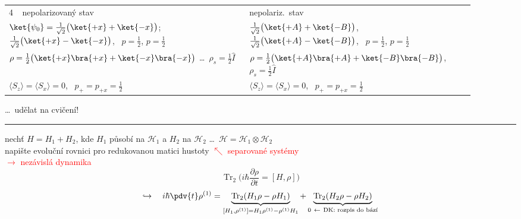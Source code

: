 \begin{tabular}{@{}p{0.47\linewidth}@{\quad$\longrightarrow$\quad}p{0.44\linewidth}@{}}
\textcircled{4} \ nepolarizovaný stav & nepolariz.\ stav \\
$\ket{\psi_0} = \tfrac{1}{\sqrt2}\big(\ket{+x} + \ket{-x}\big)$; \ $\tfrac{1}{\sqrt2}\big(\ket{+x} - \ket{-x}\big)$, \ $p = \frac12$, $p = \frac12$ &
$\tfrac{1}{\sqrt2}\big(\ket{+A} + \ket{-B}\big)$, \ $\tfrac{1}{\sqrt2}\big(\ket{+A} - \ket{-B}\big)$, \ $p = \frac12$, $p = \frac12$ \\
$\rho = \frac12\big(\ket{+x}\bra{+x} + \ket{-x}\bra{-x}\big)$ \dots\ $\rho_s = \frac12\hat I$ &
$\rho = \frac12\big(\ket{+A}\bra{+A} + \ket{-B}\bra{-B}\big)$, \ $\rho_s = \frac12\hat I$ \\
$\langle S_z\rangle = \langle S_x\rangle = 0$, \ $p_+ = p_{+x} = \frac12$ & $\langle S_z\rangle = \langle S_x\rangle = 0$, \ $p_+ = p_{+x} = \frac12$
\end{tabular}
\renewcommand{\arraystretch}{1}

\dots\ udělat na cvičení!

\noindent\rule{\linewidth}{0.4pt}

\begin{priklad}[PŘ 2]
nechť $H = H_1 + H_2$, kde $H_1$ působí na $\mathcal{H}_1$ a $H_2$ na $\mathcal{H}_2$ \dots\ $\mathcal{H} = \mathcal{H}_1\otimes\mathcal{H}_2$ \\
napište evoluční rovnici pro redukovanou matici hustoty \hfill \textcolor{Red}{$\nwarrow$ separované systémy} \\
\phantom{x} \hfill \textcolor{Red}{$\to$ nezávislá dynamika}
\[
  \operatorname{Tr}_2\Big(i\hbar\frac{\partial\rho}{\partial t} = [H,\rho]\Big)
\]
\[
  \hookrightarrow\quad i\hbar\pdv{t}\rho^{(1)} = \underbrace{\operatorname{Tr}_2(H_1\rho - \rho H_1)}_{[H_1,\rho^{(1)}] = H_1\rho^{(1)} - \rho^{(1)}H_1}
  + \underbrace{\operatorname{Tr}_2(H_2\rho - \rho H_2)}_{0\ \leftarrow\ \text{DK: rozpis do bází}}
\]
\end{priklad}

